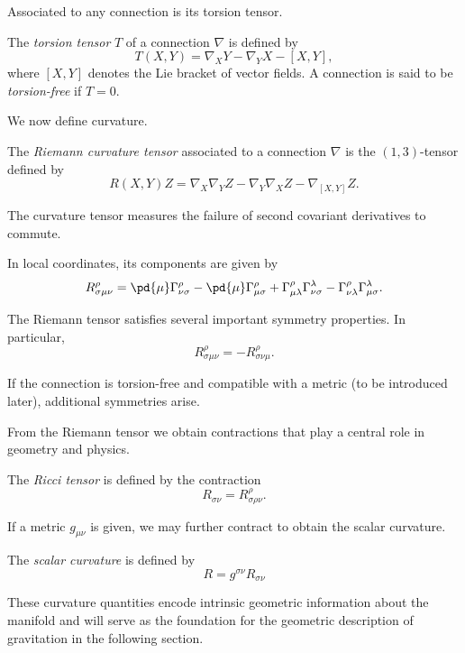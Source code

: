 Associated to any connection is its torsion tensor.

\begin{definition}
  The \emph{torsion tensor} $T$ of a connection $\nabla$ is defined by
  \[%
    T(X,Y) = \nabla_X Y - \nabla_Y X - [X,Y]
  ,\]%
  where $[X,Y]$ denotes the Lie bracket of vector fields. A connection is said to be \emph{torsion-free} if $T = 0$.
\end{definition}

We now define curvature.
\begin{definition}
  The \emph{Riemann curvature tensor} associated to a connection $\nabla$ is the $(1,3)$-tensor defined by
  \[%
    R(X,Y)Z = \nabla_X \nabla_Y Z - \nabla_Y \nabla_X Z - \nabla_{[X,Y]} Z
  .\]%
\end{definition}

The curvature tensor measures the failure of second covariant derivatives to commute.

In local coordinates, its components are given by
\[%
  R^\rho_{\sigma\mu\nu} = \pd{\mu} \Gamma^\rho_{\nu\sigma} - \pd{\mu} \Gamma^\rho_{\mu\sigma} + \Gamma^\rho_{\mu\lambda} \Gamma^\lambda_{\nu\sigma} - \Gamma^\rho_{\nu\lambda} \Gamma^\lambda_{\mu\sigma}
.\]%

The Riemann tensor satisfies several important symmetry properties. In particular,
\[%
  R^\rho_{\sigma\mu\nu} = - R^\rho_{\sigma\nu\mu}
.\]%

If the connection is torsion-free and compatible with a metric (to be introduced later), additional symmetries arise.

From the Riemann tensor we obtain contractions that play a central role in geometry and physics.
\begin{definition}
  The \emph{Ricci tensor} is defined by the contraction
  \[%
    R_{\sigma\nu} = R^\rho_{\sigma\rho\nu}
  .\]%
\end{definition}

If a metric $g_{\mu\nu}$ is given, we may further contract to obtain the scalar curvature.

\begin{definition}
  The \emph{scalar curvature} is defined by
  \[%
    R = g^{\sigma\nu} R_{\sigma\nu}
  \]%
\end{definition}

These curvature quantities encode intrinsic geometric information about the manifold and will serve as the foundation for the geometric description of gravitation in the following section.

